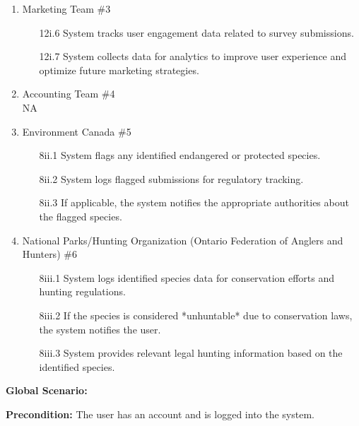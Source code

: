 \documentclass[]{article}
\begin{document}
\begin{enumerate}[{\bf BE1.}]
\begin{enumerate}[{\bf VP1.}]
        \item Marketing Team \#3 \\
\begin{enumerate}
    \item [12i.6] System tracks user engagement data related to survey submissions.
    \item [12i.7] System collects data for analytics to improve user experience and optimize future marketing strategies.
\end{enumerate}

        \item Accounting Team \#4 \\
        \newline NA

        \item Environment Canada \#5 \\
\begin{enumerate}
    \item[8ii.1] System flags any identified endangered or protected species.
    \item[8ii.2] System logs flagged submissions for regulatory tracking.
    \item[8ii.3] If applicable, the system notifies the appropriate authorities about the flagged species.
\end{enumerate}

        \item National Parks/Hunting Organization (Ontario Federation of Anglers and Hunters) \#6 \\
\begin{enumerate}
    \item [8iii.1] System logs identified species data for conservation efforts and hunting regulations.
    \item[8iii.2] If the species is considered *unhuntable* due to conservation laws, the system notifies the user.
    \item[8iii.3] System provides relevant legal hunting information based on the identified species.
\end{enumerate}
        
\end{enumerate}

\textbf{Global Scenario:}

\textbf{Precondition:} The user has an account and is logged into the system.


\end{enumerate}
\end{document}
